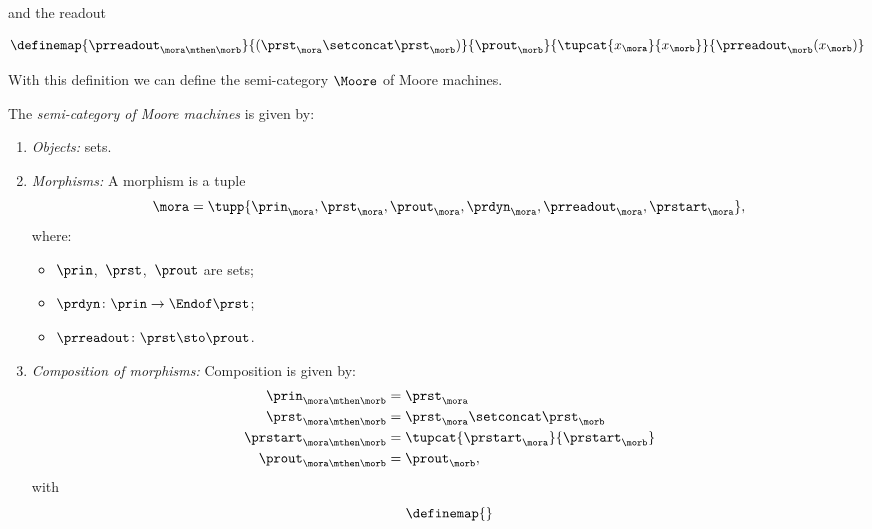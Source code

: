 and the readout

\begin{equation}
    \label{eq:moore-comp-good-3}
    \definemap{
        \prreadout_{\mora\mthen\morb}
    }{
        (\prst_{\mora} \setconcat \prst_{\morb})
    }{
        \prout_{\morb}
    }{
        \tupcat{x_{\mora}}{x_{\morb}}
    }{
        \prreadout_{\morb}(x_{\morb})
    }
\end{equation}


With this definition we can define the semi-category $\Moore$ of Moore machines.

\begin{definition}[\Moore]
    \label{def:Moore}
    The \emph{semi-category of Moore machines} \Moore is given by:
    \begin{enumerate}
        \item \emph{Objects:} sets.
        \item \emph{Morphisms:} A morphism is a tuple
        \begin{equation}
            \mora = \tupp{\prin_{\mora},\prst_{\mora},\prout_{\mora},\prdyn_{\mora},\prreadout_{\mora},\prstart_{\mora}},
        \end{equation}
        where:
        \begin{itemize}
            \item $\prin$,~$\prst$,~$\prout$ are sets;
            \item $ \prdyn \colon \prin \to \Endof \prst$;
            \item $ \prreadout \colon \prst \sto \prout$.
        \end{itemize}
        \item \emph{Composition of morphisms:} Composition is given by:
        \begin{equation}
            \begin{aligned}
                \prin_{\mora\mthen\morb} &= \prst_{\mora}   \\
                \prst_{\mora\mthen\morb} &= \prst_{\mora} \setconcat \prst_{\morb} \\
                \prstart_{\mora\mthen\morb} &= \tupcat{\prstart_{\mora}}{\prstart_{\morb}} \\
                \prout_{\mora\mthen\morb} &= \prout_{\morb},
            \end{aligned}
        \end{equation}
        with
        \begin{equation}
            \label{eq:moore_dyn_comp}
            \definemap{
}
\end{equation}
\end{enumerate}
\end{definition}
